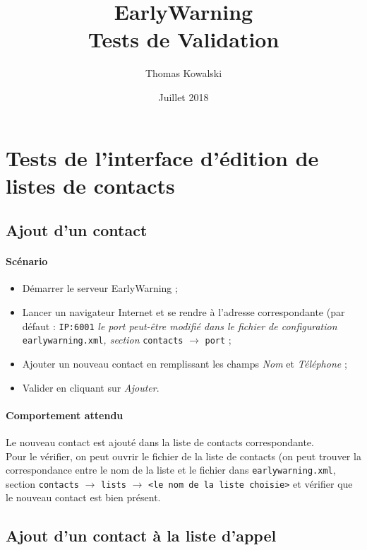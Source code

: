 \documentclass{article}
\title{\textbf{EarlyWarning}\\Tests de Validation}
\author{Thomas Kowalski}
\date{Juillet 2018}
\begin{document}
\maketitle


\pagebreak
\tableofcontents

\pagebreak
\section{Tests de l'interface d'édition de listes de contacts}

\subsection{Ajout d'un contact}

\paragraph{Scénario}

\begin{itemize}
    \item Démarrer le serveur EarlyWarning ;
    \item Lancer un navigateur Internet et se rendre à l'adresse correspondante (par défaut : \texttt{IP:6001} \textit{le port peut-être modifié dans le fichier de configuration} \texttt{earlywarning.xml}\textit{, section} \texttt{contacts} $\rightarrow$ \texttt{port} ;
    \item Ajouter un nouveau contact en remplissant les champs \textit{Nom} et \textit{Téléphone} ;
    \item Valider en cliquant sur \textit{Ajouter}.
\end{itemize}

\paragraph{Comportement attendu\\}

Le nouveau contact est ajouté dans la liste de contacts correspondante. \\
Pour le vérifier, on peut ouvrir le fichier de la liste de contacts (on peut trouver la correspondance entre le nom de la liste et le fichier dans \texttt{earlywarning.xml}, section \texttt{contacts} $\rightarrow$ \texttt{lists} $\rightarrow$ \texttt{<le nom de la liste choisie>} et vérifier que le nouveau contact est bien présent.

\subsection{Ajout d'un contact à la liste d'appel}
\end{document}

